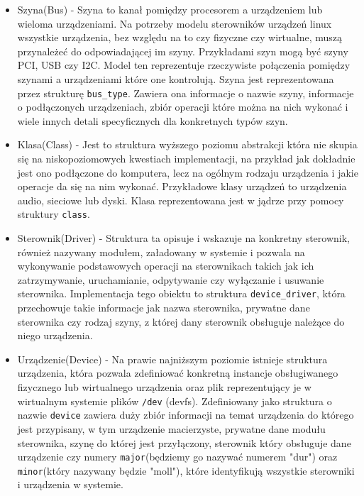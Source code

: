 \documentclass[10pt]{article}
\begin{document}
\begin{itemize}
\item
  Szyna(Bus) - Szyna to kanał pomiędzy procesorem a urządzeniem lub wieloma urządzeniami. Na potrzeby modelu sterowników urządzeń linux wszystkie urządzenia, bez względu na to czy fizyczne czy wirtualne, muszą przynależeć do odpowiadającej im szyny. Przykładami szyn mogą być szyny PCI, USB czy I2C. Model ten reprezentuje rzeczywiste połączenia pomiędzy szynami a urządzeniami które one kontrolują. Szyna jest reprezentowana przez strukturę \texttt{bus\_type}. Zawiera ona informacje o nazwie szyny, informacje o podłączonych urządzeniach, zbiór operacji które można na nich wykonać i wiele innych detali specyficznych dla konkretnych typów szyn.
\item
  Klasa(Class) - Jest to struktura wyższego poziomu abstrakcji która nie skupia się na niskopoziomowych kwestiach implementacji, na przykład jak dokładnie jest ono podłączone do komputera, lecz na ogólnym rodzaju urządzenia i jakie operacje da się na nim wykonać. Przykładowe klasy urządzeń to urządzenia audio, sieciowe lub dyski. Klasa reprezentowana jest w jądrze przy pomocy struktury \texttt{class}.
\item
  Sterownik(Driver) - Struktura ta opisuje i wskazuje na konkretny sterownik, również nazywany modułem, załadowany w systemie i pozwala na wykonywanie podstawowych operacji na sterownikach takich jak ich zatrzymywanie, uruchamianie, odpytywanie czy wyłączanie i usuwanie sterownika. Implementacja tego obiektu to struktura \texttt{device\_driver}, która przechowuje takie informacje jak nazwa sterownika, prywatne dane sterownika czy rodzaj szyny, z której dany sterownik obsługuje należące do niego urządzenia.
\item
  Urządzenie(Device) - Na prawie najniższym poziomie istnieje struktura urządzenia, która pozwala zdefiniować konkretną instancje obsługiwanego fizycznego lub wirtualnego urządzenia oraz plik reprezentujący je w wirtualnym systemie plików \texttt{/dev} (devfs).  Zdefiniowany jako struktura o nazwie \texttt{device} zawiera duży zbiór informacji na temat urządzenia do którego jest przypisany, w tym urządzenie macierzyste, prywatne dane modułu sterownika, szynę do której jest przyłączony, sterownik który obsługuje dane urządzenie czy numery \texttt{major}(będziemy go nazywać numerem "dur") oraz \texttt{minor}(który nazywany będzie "moll"), które identyfikują wszystkie sterowniki i urządzenia w systemie.
\end{itemize}
\end{document}
